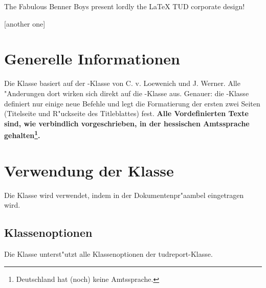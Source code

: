 \documentclass[article,dr=phil,type=drfinal,colorback,accentcolor=tud9c]{tudthesis}
\begin{document}
    {The Fabulous Benner Boys present lordly the {\LaTeX} TUD corporate design!}
  \author{Johnnie Walker}
  [another one]
  \dateofexam{\today}{\today}
  \makethesistitle

  \section{Generelle Informationen}
    Die Klasse basiert auf der -Klasse von C. v. Loewenich und
    J. Werner. Alle "Anderungen dort wirken sich direkt auf die
    -Klasse aus. Genauer: die -Klasse definiert nur einige
    neue Befehle und legt die Formatierung der ersten zwei Seiten (Titelseite
    und R"uckseite des Titleblattes) fest. \textbf{Alle Vordefinierten Texte sind, wie verbindlich vorgeschrieben, in der hessischen Amtssprache
    gehalten\footnote{Deutschland hat (noch) keine Amtssprache.}.}

  \section{Verwendung der Klasse}
    Die Klasse wird verwendet, indem in der Dokumentenpr"aambel
    eingetragen wird.

  \subsection{Klassenoptionen}
    Die Klasse unterst"utzt alle Klassenoptionen der tudreport-Klasse.
\end{document}
